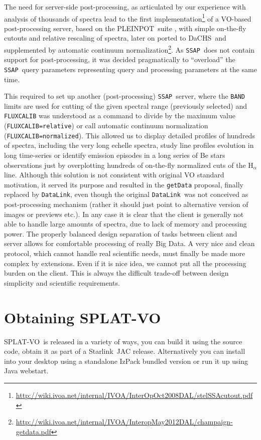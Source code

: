 \documentclass[final,authoryear,5p,times,twocolumn]{elsarticle}
\newcommand{\datalink}{\texttt{DataLink}}
\newcommand{\ssap}{\texttt{SSAP}}
\newcommand{\splatvo}{{\textsf{\small{SPLAT-VO}}}}
\newcommand{\dachs}{\textsf{\small DaCHS}}
\newcommand{\pleinpot}{\textsf{\small PLEINPOT}}
\newcommand{\Starlink}{\textsf{\small Starlink}}
\begin{document}
The need for server-side post-processing, as articulated by our experience with
analysis of thousands of spectra lead to the first
implementation\footnote{\url{http://wiki.ivoa.net/internal/IVOA/InterOpOct2008DAL/stelSSAcutout.pdf}}
of a VO-based post-processing server, based on the \pleinpot\ suite
\citep{2005ASPC..347..385C}, with simple on-the-fly cutouts and relative
rescaling of spectra, later on ported to \dachs\ and supplemented by automatic
continuum
normalization\footnote{\url{http://wiki.ivoa.net/internal/IVOA/InteropMay2012DAL/champaign-getdata.pdf}}.
As \ssap\ does not contain support for post-processing, it was decided
pragmatically to ``overload'' the \ssap\ query parameters representing query
and processing parameters at the same time.

This required to set up another (post-processing) \ssap\ server, where the
\texttt{BAND} limits are used for cutting of the given spectral range
(previously selected) and \texttt{FLUXCALIB} was understood as a command to
divide by the maximum value (\texttt{FLUXCALIB=relative}) or call automatic
continuum normalization (\texttt{FLUXCALIB=normalized}).  This allowed us to
display detailed profiles of hundreds of spectra, including the very long
echelle spectra, study line profiles evolution in long time-series or identify
emission episodes in a long series of Be stars observations just by
overplotting hundreds of on-the-fly normalized cuts of the H$_\alpha$ line.
Although this solution is not consistent with original VO standard motivation,
it served its purpose and resulted in the \texttt{getData} proposal, finally
replaced by \datalink, even though the original \datalink\ was not conceived as
post-processing mechanism (rather it should just point to alternative version
of images or previews etc.).  In any case it is clear that the client is
generally not able to handle large amounts of spectra, due to lack of memory
and processing power. The properly balanced design separation of tasks between
client and server allows for comfortable processing of really Big Data.  A very
nice and clean protocol, which cannot handle real scientific needs, must
finally be made more complex by extensions. Even if it is nice idea, we cannot
put all the processing burden on the client.  This is always the difficult
trade-off between design simplicity and scientific requirements.

\section{Obtaining SPLAT-VO}
%
\splatvo\ is released in a variety of ways, you can build it using the source
code, obtain it as part of a \Starlink\ JAC release. Alternatively you can
install into your desktop using a standalone IzPack bundled version or run it
up using Java webstart.
\end{document}
